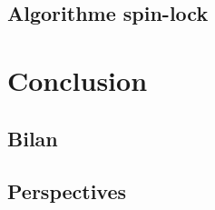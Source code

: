 \documentclass[9pt]{beamer}
\begin{document}
\subsection{Algorithme spin-lock}
  
 
 
\section{Conclusion}
 
\subsection{Bilan}

 
\subsection{Perspectives}


\end{document}
